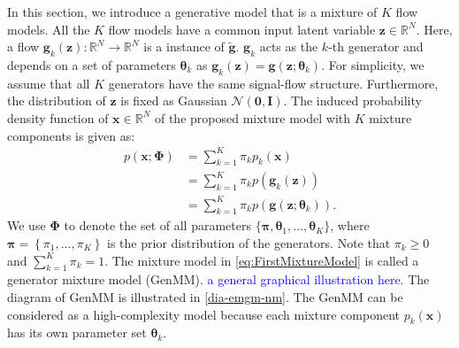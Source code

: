 In this section, we introduce a generative model that is a mixture of $K$ flow models. All the $K$ flow models have a common input latent variable $\bm{z} \in \mathbb{R}^N$. Here, a flow $\bm{g}_k(\bm{z}): \mathbb{R}^N
\rightarrow \mathbb{R}^N$ is a instance of $\tilde{\bm{g}}$. $\bm{g}_k$ acts as the $k$-th generator and depends on a set of parameters $\bm{\theta}_k$ as
$\bm{g}_k(\bm{z})=\bm{g}(\bm{z};\boldsymbol{\theta}_k)$. For
simplicity, we assume that all $K$ generators have the same
signal-flow structure. Furthermore, the distribution of $\bm{z}$ is fixed as Gaussian $\mathcal{N}(\bm{0},\bm{I})$.
The induced probability density function of $\bm{x} \in \mathbb{R}^N$ of the proposed mixture model with $K$ mixture components is given as:
\begin{align}\label{eq:FirstMixtureModel}
  p(\bm{x};\bm{\Phi})  &= \textstyle\sum_{k=1}^K \pi_k  p_k(\bm{x}) \nonumber\\
                       &= \textstyle \sum_{k=1}^K \pi_k  p(\bm{g}_k(\bm{z}))\nonumber\\
                       &= \textstyle \sum_{k=1}^K \pi_k  p(\bm{g}(\bm{z};\boldsymbol{\theta}_k)).
\end{align}
We use $\bm{\Phi}$ to denote the set of all parameters $ \{\bm{\pi},\bm{\theta}_1, \dots, \bm{\theta}_K \}$, where $\bm{\pi} = \left\{ \pi_1, \hdots, \pi_K \right\}$ is the prior distribution of the generators. Note that $\pi_k \geq 0$ and $\sum_{k=1}^K \pi_k =1$. The mixture model
in \eqref{eq:FirstMixtureModel} is called a generator mixture model (GenMM). \textcolor{blue}{a general graphical illustration here}. The
diagram of GenMM is illustrated in \autoref{dia-emgm-nm}. The GenMM can be considered as a high-complexity model because each mixture component $p_k(\bm{x})$ has its own parameter set $\bm{\theta}_k$. 

